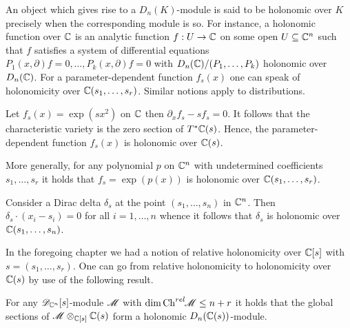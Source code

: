 An object which gives rise to a $D_n(K)$-module is said to be holonomic over $K$ precisely when the corresponding module is so.
For instance, a holonomic function over $\mathbb{C}$ is an analytic function $f:U\to \mathbb{C}$ on some open $U\subseteq \mathbb{C}^n$ such that $f$ satisfies a system of differential equations $P_{1}(x,\partial)f = 0,\ldots, P_{k}(x,\partial)f=0$ with $D_n(\mathbb{C})/(P_1,\ldots,P_k)$ holonomic over $D_n(\mathbb{C})$.
For a parameter-dependent function $f_s(x)$ one can speak of holonomicity over $\mathbb{C}(s_1,\ldots,s_r)$.
Similar notions apply to distributions.
\begin{example}
  Let $f_s(x) = \exp(sx^2)$ on $\mathbb{C}$ then  $\partial_{x}f_s - sf_s = 0$.
  It follows that the characteristic variety is the zero section of $T^*\mathbb{C}(s)$.
  Hence, the parameter-dependent function $f_s(x)$ is holonomic over $\mathbb{C}(s)$.

  More generally, for any polynomial $p$ on $\mathbb{C}^n$ with undetermined coefficients $s_1,\ldots,s_r$ it holds that $f_s = \exp(p(x))$ is holonomic over $\mathbb{C}(s_1,\ldots,s_r)$.
\end{example}
\begin{example}
  Consider a Dirac delta $\delta_{s}$ at the point $(s_1,\ldots,s_n)$ in $\mathbb{C}^n$.
  Then $\delta_{s}\cdot (x_i - s_i) = 0$ for all $i=1,\ldots,n$ whence it follows that $\delta_s$ is holonomic over $\mathbb{C}(s_1,\ldots,s_n)$.
\end{example}
In the foregoing chapter we had a notion of relative holonomicity over $\mathbb{C}[s]$ with $s = (s_1,\ldots,s_r)$.
One can go from relative holonomicity to holonomicity over $\mathbb{C}(s)$ by use of the following result.
\begin{lemma}
    For any $\mathscr{D}_{\mathbb{C}^n}[s]$-module $\mathscr{M}$ with $\dim\operatorname{Ch}^{rel}\mkern-5mu\mathscr{M}\leq n+r$ it holds that the global sections of $\mathscr{M}\otimes_{\mathbb{C}[s]}\mathbb{C}(s)$ form a holonomic $D_n(\mathbb{C}(s))$-module.
\end{lemma}
